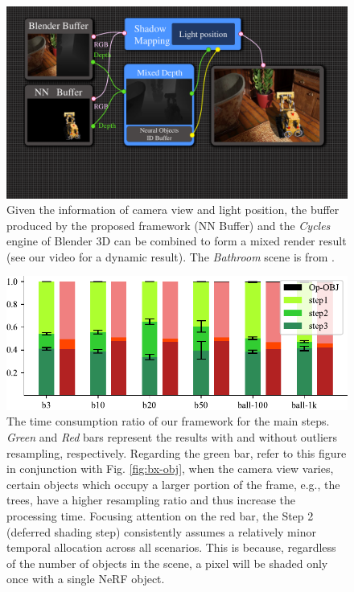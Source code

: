 \documentclass[letterpaper]{article} %
\begin{document}
\begin{figure}[htbp]
    \centering
    \includegraphics[width=\linewidth]{figure/mixed_pipeline.pdf}
    \caption{Given the information of camera view and light position, the buffer produced by the proposed framework (NN Buffer) and the \textit{Cycles} engine of Blender 3D can be combined to form a mixed render result (see our video for a dynamic result). The \textit{Bathroom} scene is from \cite{huang2022hdr}.}
    \label{fig:mixed_pipeline}
\end{figure}

\begin{figure}[htbp]
    \centering
    \includegraphics[width=\linewidth]{figure/step_ratio_6.pdf}
    \caption{The time consumption ratio of our framework for the main steps. %
    \textit{Green} and \textit{Red} bars represent the results with and without outliers resampling, respectively. Regarding the green bar, refer to this figure in conjunction with Fig. \ref{fig:bx-obj}, when the camera view varies, certain objects which occupy a larger portion of the frame, e.g., the trees, have a higher resampling ratio and thus increase the processing time. Focusing attention on the red bar, the Step 2 (deferred shading step) consistently assumes a relatively minor temporal allocation across all scenarios. This is because, regardless of the number of objects in the scene, a pixel will be shaded only once with a single NeRF object.
    }
    \label{fig:step_ratio}
\end{figure}
\end{document}
